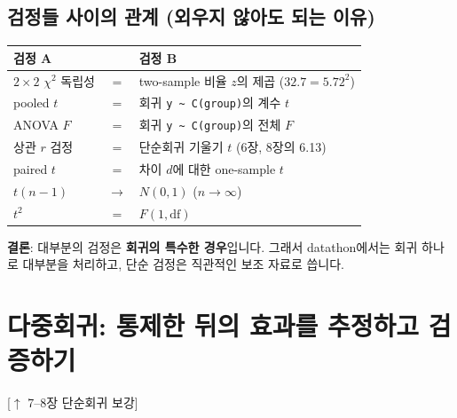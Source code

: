 \documentclass[11pt,a4paper]{article}
\newcommand{\code}[1]{\texttt{#1}}
\newcommand{\linkup}[1]{{\footnotesize\textsf{\color{green!40!black}[$\uparrow$ #1 보강]}}}
\begin{document}
\subsection{검정들 사이의 관계 (외우지 않아도 되는 이유)}
\begin{center}
\begin{tabular}{@{}l c l@{}}
\toprule
검정 A & & 검정 B \\
\midrule
$2\times2$ $\chi^2$ 독립성 & $=$ & two-sample 비율 $z$의 제곱 ($32.7=5.72^2$) \\
pooled $t$ & $=$ & 회귀 \code{y \~{} C(group)}의 계수 $t$ \\
ANOVA $F$ & $=$ & 회귀 \code{y \~{} C(group)}의 전체 $F$ \\
상관 $r$ 검정 & $=$ & 단순회귀 기울기 $t$ (6장, 8장의 6.13) \\
paired $t$ & $=$ & 차이 $d$에 대한 one-sample $t$ \\
$t(n-1)$ & $\to$ & $N(0,1)$ ($n\to\infty$) \\
$t^2$ & $=$ & $F(1,\text{df})$ \\
\bottomrule
\end{tabular}
\end{center}
\textbf{결론}: 대부분의 검정은 \textbf{회귀의 특수한 경우}입니다. 그래서 datathon에서는 회귀 하나로 대부분을 처리하고, 단순 검정은 직관적인 보조 자료로 씁니다.

\section{다중회귀: 통제한 뒤의 효과를 추정하고 검증하기}
\linkup{7–8장 단순회귀}
\end{document}
